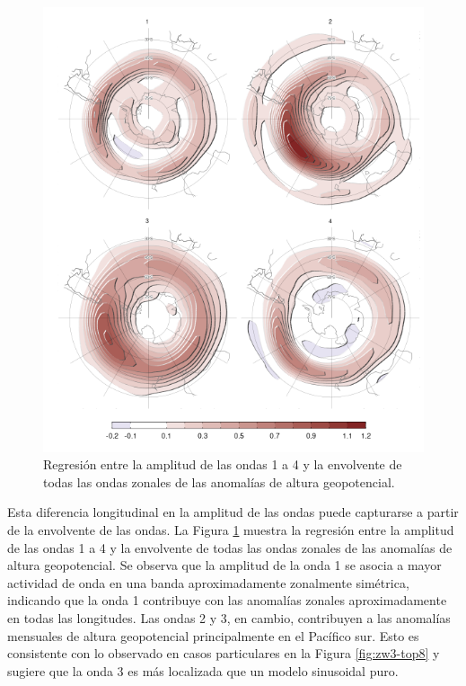 \documentclass[12pt,oneside]{reedthesis}
\begin{document}
\begin{figure}
\includegraphics{figures/15-onda3/envelope-regr-1} \caption{Regresión entre la amplitud de las ondas 1 a 4 y la envolvente de todas las ondas zonales de las anomalías de altura geopotencial.}\label{fig:envelope-regr}
\end{figure}



Esta diferencia longitudinal en la amplitud de las ondas puede capturarse a partir de la envolvente de las ondas.
La Figura \ref{fig:envelope-regr} muestra la regresión entre la amplitud de las ondas 1 a 4 y la envolvente de todas las ondas zonales de las anomalías de altura geopotencial.
Se observa que la amplitud de la onda 1 se asocia a mayor actividad de onda en una banda aproximadamente zonalmente simétrica, indicando que la onda 1 contribuye con las anomalías zonales aproximadamente en todas las longitudes.
Las ondas 2 y 3, en cambio, contribuyen a las anomalías mensuales de altura geopotencial principalmente en el Pacífico sur.
Esto es consistente con lo observado en casos particulares en la Figura \ref{fig:zw3-top8} y sugiere que la onda 3 es más localizada que un modelo sinusoidal puro.
\end{document}

